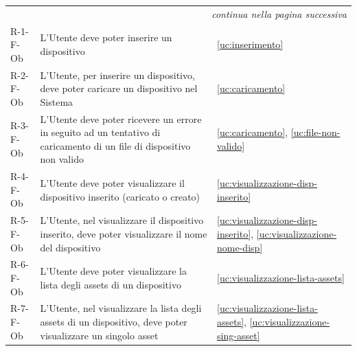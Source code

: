 ﻿\documentclass[a4paper,12pt]{article}
\begin{document}
{{\begin{longtable}{|l|p{}|p{}|}
            \hline
            \multicolumn{3}{r}{\textit{continua nella pagina successiva}}                                                                                                                                                                                                                          \\
            \endfoot

            \hline
            \endlastfoot

            R-1-F-Ob        & L'Utente deve poter inserire un dispositivo                                                                                                                                                 & \ref{uc:inserimento}                                                 \\ \hline
            R-2-F-Ob        & L'Utente, per inserire un dispositivo, deve poter caricare un dispositivo nel Sistema                                                                                                       & \ref{uc:caricamento}                                                 \\ \hline
            R-3-F-Ob        & L'Utente deve poter ricevere un errore in seguito ad un tentativo di caricamento di un file di dispositivo non valido                                                                       & \ref{uc:caricamento}, \ref{uc:file-non-valido}                         \\ \hline
            R-4-F-Ob        & L'Utente deve poter visualizzare il dispositivo inserito (caricato o creato)                                                                                                                & \ref{uc:visualizzazione-disp-inserito}                                                 \\ \hline
            R-5-F-Ob        & L'Utente, nel visualizzare il dispositivo inserito, deve poter visualizzare il nome del dispositivo                                                                                         & \ref{uc:visualizzazione-disp-inserito}, \ref{uc:visualizzazione-nome-disp}                   \\ \hline
            R-6-F-Ob        & L'Utente deve poter visualizzare la lista degli assets di un dispositivo                                                                                                                    & \ref{uc:visualizzazione-lista-assets}                                                 \\ \hline
            R-7-F-Ob        & L'Utente, nel visualizzare la lista degli assets di un dispositivo, deve poter visualizzare un singolo asset                                                                                & \ref{uc:visualizzazione-lista-assets}, \ref{uc:visualizzazione-sing-asset}                     \\ \hline

\end{longtable}}}
\end{document}
